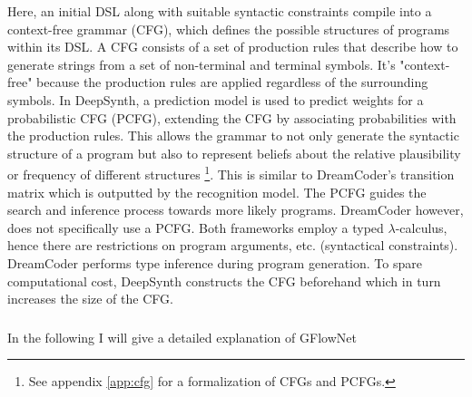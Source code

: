 Here, an initial DSL along with suitable syntactic constraints compile into a context-free grammar (CFG), which defines the possible structures of programs within its DSL. A CFG consists of a set of production rules that describe how to generate strings from a set of non-terminal and terminal symbols. It's "context-free" because the production rules are applied regardless of the surrounding symbols.
In DeepSynth, a prediction model is used to predict weights for a probabilistic CFG (PCFG), extending the CFG by associating probabilities with the production rules. This allows the grammar to not only generate the syntactic structure of a program but also to represent beliefs about the relative plausibility or frequency of different structures \footnote{See appendix \ref{app:cfg} for a formalization of CFGs and PCFGs.}. This is similar to DreamCoder's transition matrix which is outputted by the recognition model. The PCFG guides the search and inference process towards more likely programs. DreamCoder however, does not specifically use a PCFG. Both frameworks employ a typed $\lambda$-calculus, hence there are restrictions on program arguments, etc. (syntactical constraints). DreamCoder performs type inference during program generation. To spare computational cost, DeepSynth constructs the CFG beforehand which in turn increases the size of the CFG.

\subsubsection{}\label{sec:gflownet}
In the following I will give a detailed explanation of GFlowNet

